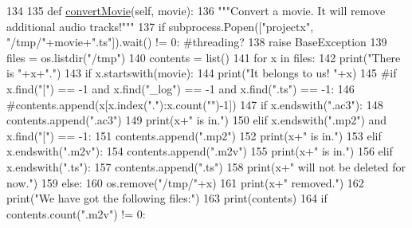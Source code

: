 \begin{DoxyCode}
134 
135     \textcolor{keyword}{def }\hyperlink{classmovies2hdd_1_1_movies2_h_d_d_afafc16b9fc0e83485db9b47d7ba7e386}{convertMovie}(self, movie):
136         \textcolor{stringliteral}{"""Convert a movie. It will remove additional audio tracks!"""}
137         \textcolor{keywordflow}{if} subprocess.Popen([\textcolor{stringliteral}{"projectx"}, \textcolor{stringliteral}{"/tmp/"}+movie+\textcolor{stringliteral}{".ts"}]).wait() != 0: \textcolor{comment}{#threading?}
138             \textcolor{keywordflow}{raise} BaseException
139         files = os.listdir(\textcolor{stringliteral}{"/tmp"})
140         contents = list()
141         \textcolor{keywordflow}{for} x \textcolor{keywordflow}{in} files:
142             print(\textcolor{stringliteral}{"There is "}+x+\textcolor{stringliteral}{"."})
143             \textcolor{keywordflow}{if} x.startswith(movie):
144                 print(\textcolor{stringliteral}{"It belongs to us! "}+x)
145                 \textcolor{comment}{#if x.find("[") == -1 and x.find("\_log") == -1 and x.find(".ts") == -1:}
146                     \textcolor{comment}{#contents.append(x[x.index("."):x.count("")-1])}
147                 \textcolor{keywordflow}{if} x.endswith(\textcolor{stringliteral}{".ac3"}):
148                     contents.append(\textcolor{stringliteral}{".ac3"})
149                     print(x+\textcolor{stringliteral}{" is in."})
150                 \textcolor{keywordflow}{elif} x.endswith(\textcolor{stringliteral}{".mp2"}) \textcolor{keywordflow}{and} x.find(\textcolor{stringliteral}{"["}) == -1:
151                     contents.append(\textcolor{stringliteral}{".mp2"})
152                     print(x+\textcolor{stringliteral}{" is in."})
153                 \textcolor{keywordflow}{elif} x.endswith(\textcolor{stringliteral}{".m2v"}):
154                     contents.append(\textcolor{stringliteral}{".m2v"})
155                     print(x+\textcolor{stringliteral}{" is in."})
156                 \textcolor{keywordflow}{elif} x.endswith(\textcolor{stringliteral}{".ts"}):
157                     contents.append(\textcolor{stringliteral}{".ts"})
158                     print(x+\textcolor{stringliteral}{" will not be deleted for now."})
159                 \textcolor{keywordflow}{else}:
160                     os.remove(\textcolor{stringliteral}{"/tmp/"}+x)
161                     print(x+\textcolor{stringliteral}{" removed."})
162         print(\textcolor{stringliteral}{"We have got the following files:"})
163         print(contents)
164         \textcolor{keywordflow}{if} contents.count(\textcolor{stringliteral}{".m2v"}) != 0:

\end{DoxyCode}
